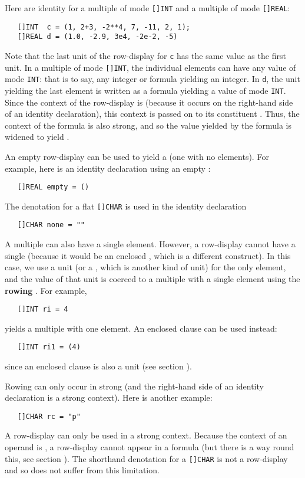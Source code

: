 Here are identity  for a
multiple of mode \verb|[]INT| and a multiple of mode \verb|[]REAL|:
\begin{verbatim}
   []INT  c = (1, 2+3, -2**4, 7, -11, 2, 1);
   []REAL d = (1.0, -2.9, 3e4, -2e-2, -5)
\end{verbatim}
\noindent
Note that the last unit of the row-display for \verb|c| has the same
value as the first unit. In a multiple of mode \verb|[]INT|, the
individual elements can have any value of mode \verb|INT|: that is to
say, any integer or formula yielding an integer.  In \verb|d|, the
unit yielding the last element is written as a formula yielding a
value of mode \verb|INT|.  Since the context of the row-display is
 (because it occurs on the right-hand
side of an identity declaration), this context is passed on to its
constituent .  Thus, the context of
the formula is also strong, and so the value yielded by the formula
is widened to yield .

An empty row-display can be used to yield a
 (one with no
elements). For example, here is an identity declaration using an
empty :
\begin{verbatim}
   []REAL empty = ()
\end{verbatim}
\noindent
The denotation for a flat \verb|[]CHAR| is used in the identity
declaration
\begin{verbatim}
   []CHAR none = ""
\end{verbatim}
\noindent
A multiple can also have a single element. However, a row-display
cannot have a single  (because it would be an enclosed
, which is a different construct). In
this case, we use a unit (or a , which is another kind of
unit) for the only element, and the value of that unit is coerced to
a multiple with a single element using the \textbf{rowing}
. For example,
\begin{verbatim}
   []INT ri = 4
\end{verbatim}
\noindent
yields a multiple with one element. An enclosed clause can be used
instead:
\begin{verbatim}
   []INT ri1 = (4)
\end{verbatim}
\noindent
since an enclosed clause is also a unit (see section ).

Rowing can only occur in strong 
(and the right-hand side of an identity declaration is a strong
context).  Here is another example:
\begin{verbatim}
   []CHAR rc = "p"
\end{verbatim}
\noindent
A row-display can only be used in a strong context. Because the
context of an operand is , a row-display
cannot appear in a formula (but there is a way round this, see
section ). The shorthand denotation for a
\verb|[]CHAR| is not a row-display and so does not suffer from this
limitation.

